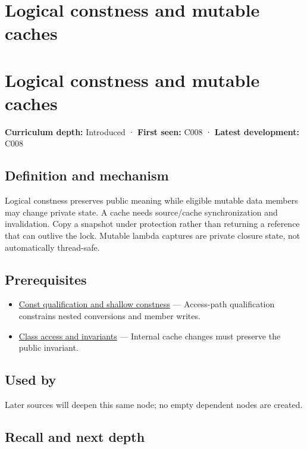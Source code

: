 \hypertarget{appendix-f5593256bcaf}{}
\section*{Logical constness and mutable caches}
\section{Logical constness and mutable caches}\label{logical-constness-and-mutable-caches}

\textbf{Curriculum depth:} Introduced · \textbf{First seen:} C008 · \textbf{Latest development:} C008

\subsection{Definition and mechanism}\label{definition-and-mechanism}

Logical constness preserves public meaning while eligible mutable data members may change private state. A cache needs source/cache synchronization and invalidation. Copy a snapshot under protection rather than returning a reference that can outlive the lock. Mutable lambda captures are private closure state, not automatically thread-safe.

\subsection{Prerequisites}\label{prerequisites}

\begin{itemize}
\tightlist
\item
  \hyperref[appendix-c25d60fed375]{Const qualification and shallow constness} --- Access-path qualification constrains nested conversions and member writes.
\item
  \hyperref[appendix-8e5214819615]{Class access and invariants} --- Internal cache changes must preserve the public invariant.
\end{itemize}

\subsection{Used by}\label{used-by}

Later sources will deepen this same node; no empty dependent nodes are created.

\subsection{Recall and next depth}\label{recall-and-next-depth}


